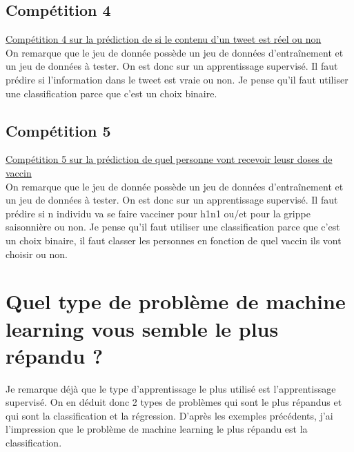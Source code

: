 \subsection{Compétition 4} 
\href{https://www.kaggle.com/competitions/nlp-getting-started}{Compétition 4 sur la prédiction de si le contenu d'un tweet est réel ou non}\\

On remarque que le jeu de donnée possède un jeu de données d’entraînement et un jeu de données à tester. On est donc sur un apprentissage supervisé. Il faut prédire si l’information dans le tweet est vraie ou non. Je pense qu’il faut utiliser une classification parce que c’est un choix binaire.


\subsection{Compétition 5} 
\href{https://www.drivendata.org/competitions/66/flu-shot-learning/page/211/}{Compétition 5 sur la prédiction de quel personne vont recevoir leusr doses de vaccin}\\

On remarque que le jeu de donnée possède un jeu de données d’entraînement et un jeu de données à tester. On est donc sur un apprentissage supervisé. Il faut prédire si n individu va se faire vacciner pour h1n1 ou/et pour la grippe saisonnière ou non. Je pense qu’il faut utiliser une classification parce que c’est un choix binaire, il faut classer les personnes en fonction de quel vaccin ils vont choisir ou non.


\section{Quel type de problème de machine learning vous semble le plus répandu ?}
Je remarque déjà que le type d’apprentissage le plus utilisé est l’apprentissage supervisé. On en déduit donc 2 types de problèmes qui sont le plus répandus et qui sont la classification et la régression. D’après les exemples précédents, j’ai l’impression que le problème de machine learning le plus répandu est la classification.